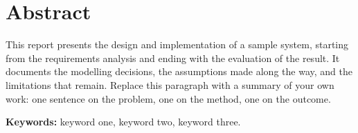 \thispagestyle{empty}

\section*{Abstract}

This report presents the design and implementation of a sample system,
starting from the requirements analysis and ending with the evaluation of the
result. It documents the modelling decisions, the assumptions made along the
way, and the limitations that remain. Replace this paragraph with a summary of
your own work: one sentence on the problem, one on the method, one on the
outcome.

\vspace{0.5cm}
\noindent\textbf{Keywords:} keyword one, keyword two, keyword three.
